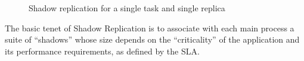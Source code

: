 \begin{figure}[!t]
	\begin{center}
	\end{center}
	\caption{Shadow replication for a single task and single replica}
	\label{fig:sc_overview}
\end{figure}

\noindent 
The basic tenet of Shadow Replication is to associate with each
main process a suite of ``shadows'' whose size depends on the
``criticality'' of the application and its performance requirements,
as defined by the SLA. 



